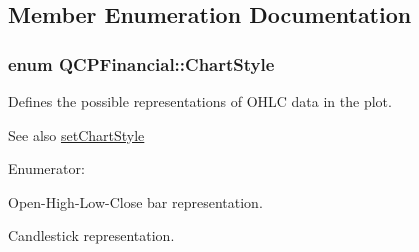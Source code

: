 \subsection{\-Member \-Enumeration \-Documentation}
\hypertarget{classQCPFinancial_a0f800e21ee98d646dfc6f8f89d10ebfb}{
\subsubsection[{\-Chart\-Style}]{\setlength{\rightskip}{0pt plus 5cm}enum {\bf \-Q\-C\-P\-Financial\-::\-Chart\-Style}}}\label{classQCPFinancial_a0f800e21ee98d646dfc6f8f89d10ebfb}
\-Defines the possible representations of \-O\-H\-L\-C data in the plot.

\begin{DoxySeeAlso}{\-See also}
\hyperlink{classQCPFinancial_a5a59175d36279d71596e64d7bb65596f}{set\-Chart\-Style} 
\end{DoxySeeAlso}
\begin{Desc}
\item[\-Enumerator\-: ]\par
\begin{description}
\item[{\em 
\hypertarget{classQCPFinancial_a0f800e21ee98d646dfc6f8f89d10ebfba3a516016c9298d3e95dd82aa203c4390}{cs\-Ohlc}\label{classQCPFinancial_a0f800e21ee98d646dfc6f8f89d10ebfba3a516016c9298d3e95dd82aa203c4390}
}]\-Open-\/\-High-\/\-Low-\/\-Close bar representation. \item[{\em 
\hypertarget{classQCPFinancial_a0f800e21ee98d646dfc6f8f89d10ebfbac803cbd39f26e3f206bcc7028679e62f}{cs\-Candlestick}\label{classQCPFinancial_a0f800e21ee98d646dfc6f8f89d10ebfbac803cbd39f26e3f206bcc7028679e62f}
}]\-Candlestick representation. \end{description}
\end{Desc}



